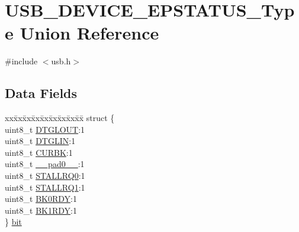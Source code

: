 \hypertarget{union_u_s_b___d_e_v_i_c_e___e_p_s_t_a_t_u_s___type}{}\section{U\+S\+B\+\_\+\+D\+E\+V\+I\+C\+E\+\_\+\+E\+P\+S\+T\+A\+T\+U\+S\+\_\+\+Type Union Reference}
\label{union_u_s_b___d_e_v_i_c_e___e_p_s_t_a_t_u_s___type}


{\ttfamily \#include $<$usb.\+h$>$}

\subsection*{Data Fields}
\begin{DoxyCompactItemize}
\item 
\begin{tabbing}
xx\=xx\=xx\=xx\=xx\=xx\=xx\=xx\=xx\=\kill
struct \{\\
\>uint8\_t \mbox{\hyperlink{union_u_s_b___d_e_v_i_c_e___e_p_s_t_a_t_u_s___type_a343a1d674b60760cbd9b9a227855a18d}{DTGLOUT}}:1\\
\>uint8\_t \mbox{\hyperlink{union_u_s_b___d_e_v_i_c_e___e_p_s_t_a_t_u_s___type_a4d3e03af44b8a3aab6216f737f671b2d}{DTGLIN}}:1\\
\>uint8\_t \mbox{\hyperlink{union_u_s_b___d_e_v_i_c_e___e_p_s_t_a_t_u_s___type_a60af70f2b5f295e7d0fad0cf6c31afb8}{CURBK}}:1\\
\>uint8\_t \mbox{\hyperlink{union_u_s_b___d_e_v_i_c_e___e_p_s_t_a_t_u_s___type_a8b4eebe79ded0459acec2f4950102ba3}{\_\_pad0\_\_}}:1\\
\>uint8\_t \mbox{\hyperlink{union_u_s_b___d_e_v_i_c_e___e_p_s_t_a_t_u_s___type_a1b62d73ab84a16453cfe76dbae8e652c}{STALLRQ0}}:1\\
\>uint8\_t \mbox{\hyperlink{union_u_s_b___d_e_v_i_c_e___e_p_s_t_a_t_u_s___type_aff69880ca0480a1518048272fd4b415c}{STALLRQ1}}:1\\
\>uint8\_t \mbox{\hyperlink{union_u_s_b___d_e_v_i_c_e___e_p_s_t_a_t_u_s___type_ae775e6182e0864ef4c8f1b31e8fc05df}{BK0RDY}}:1\\
\>uint8\_t \mbox{\hyperlink{union_u_s_b___d_e_v_i_c_e___e_p_s_t_a_t_u_s___type_a2bce60d1c409a249682ac9f0abd43e22}{BK1RDY}}:1\\
\} \mbox{\hyperlink{union_u_s_b___d_e_v_i_c_e___e_p_s_t_a_t_u_s___type_a2dd5fd0b15d0f0eb30bf186337872bce}{bit}}\\


\end{tabbing}
\end{DoxyCompactItemize}
